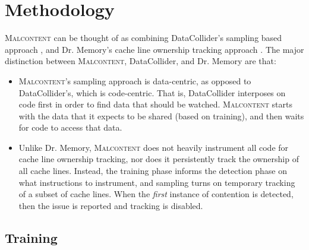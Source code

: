 \documentclass[letterpaper,twocolumn,10pt]{article}
\newcommand{\TextToolname}{Malcontent}
\newcommand{\Toolname}{\textsc{\TextToolname{}}}
\begin{document}


\section{Methodology}\label{sec:methodology}

\Toolname{} can be thought of as combining DataCollider's sampling based approach \cite{DataCollider}, and Dr. Memory's
cache line ownership tracking approach \cite{DrContention}. The major distinction between \Toolname, DataCollider, and
Dr. Memory are that:
\begin{itemize}
\item \Toolname's sampling approach is data-centric, as opposed to DataCollider's, which is code-centric. That is, DataCollider
interposes on code first in order to find data that should be watched. \Toolname{} starts with the data that it expects to
be shared (based on training), and then waits for code to access that data.

\item Unlike Dr. Memory, \Toolname{} does not heavily instrument all code for cache line ownership tracking, nor does it
persistently track the ownership of all cache lines. Instead, the training phase informs the detection phase on what
instructions to instrument, and sampling turns on temporary tracking of a subset of cache lines. When the \emph{first}
instance of contention is detected, then the issue is reported and tracking is disabled.
\end{itemize}

\subsection{Training}

\end{document}
